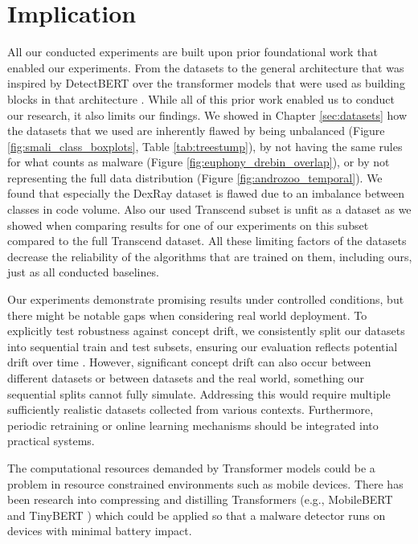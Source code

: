\section{Implication}

All our conducted experiments are built upon prior foundational work that enabled our experiments. 
From the datasets \cite{drebin, transcend, dexray} to the general architecture that was 
inspired by DetectBERT \cite{detectbert} over the transformer models 
that were used as building blocks in that architecture \cite{modernbert,bigbird,longformer}. 
While all of this prior work enabled us to conduct our research, it also limits our findings. 
We showed in Chapter \ref{sec:datasets} how the datasets that we used are inherently flawed by 
being unbalanced (Figure \ref{fig:smali_class_boxplots}, Table \ref{tab:treestump}), 
by not having the same rules for what counts as malware (Figure \ref{fig:euphony_drebin_overlap}), 
or by not representing the full data distribution (Figure \ref{fig:androzoo_temporal}). 
We found that especially the DexRay \cite{dexray} dataset is flawed due to an imbalance between classes in 
code volume. 
Also our used Transcend subset is unfit as a dataset as we showed when comparing results for one of our experiments 
on this subset compared to the full Transcend dataset.
All these limiting factors of the datasets decrease the reliability of the algorithms 
that are trained on them, including ours, just as all conducted baselines.

Our experiments demonstrate promising results under controlled conditions, 
but there might be notable gaps when considering real world deployment. 
To explicitly test robustness against concept drift, 
we consistently split our datasets into sequential train and test subsets, 
ensuring our evaluation reflects potential drift over time \cite{tesseract}. 
However, significant concept drift can also occur between different datasets or between 
datasets and the real world, something our sequential splits cannot fully simulate. 
Addressing this would require multiple sufficiently realistic datasets collected from various 
contexts. 
Furthermore, periodic retraining or online learning mechanisms should be integrated 
into practical systems. 

The computational resources demanded by Transformer models could be a problem 
in resource constrained environments such as mobile devices. 
There has been research into compressing and distilling Transformers 
(e.g., MobileBERT \cite{mobilebert} and TinyBERT \cite{tinybert}) 
which could be applied so that a malware detector runs on devices with minimal battery impact. 


